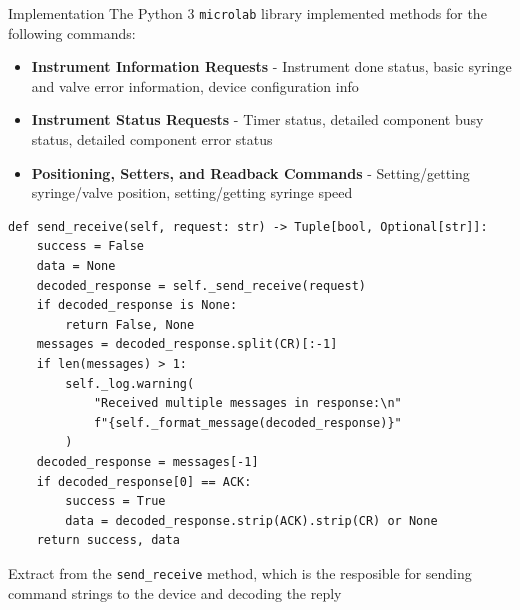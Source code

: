 \documentclass[a0paper,landscape,fontscale=0.32]{baposter}
\begin{document}
\begin{poster}
\begin{posterbox}[name=implementation,column=1,span=2]{Implementation}
The Python 3 \texttt{microlab} library implemented methods for the following commands:
 \begin{itemize}
     \item \textbf{Instrument Information Requests} - Instrument done status, basic syringe and valve error
         information, device configuration info
     \item \textbf{Instrument Status Requests} - Timer status, detailed component busy status, detailed
         component error status
     \item \textbf{Positioning, Setters, and Readback Commands} - Setting/getting
         syringe/valve position, setting/getting syringe speed 
\end{itemize}
\vspace{-1.5em}
\begin{listing}[H]
    \begin{verbatim}
def send_receive(self, request: str) -> Tuple[bool, Optional[str]]:
    success = False
    data = None
    decoded_response = self._send_receive(request)
    if decoded_response is None:
        return False, None
    messages = decoded_response.split(CR)[:-1]
    if len(messages) > 1:
        self._log.warning(
            "Received multiple messages in response:\n"
            f"{self._format_message(decoded_response)}"
        )
    decoded_response = messages[-1]
    if decoded_response[0] == ACK:
        success = True
        data = decoded_response.strip(ACK).strip(CR) or None
    return success, data
\end{verbatim}
    \caption{Extract from the \texttt{send\_receive} method, which is the resposible for sending command
    strings to the device and decoding the reply}
\end{listing}

\end{posterbox}
\end{poster}
\end{document}
